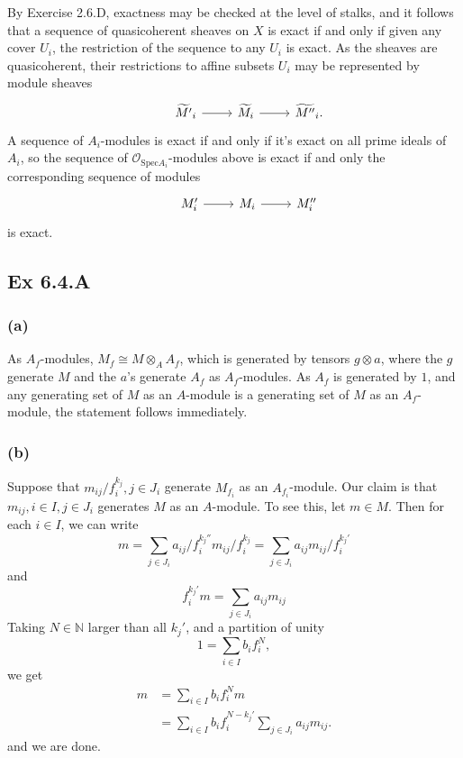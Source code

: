 \documentclass{article}
\theoremstyle{definition}
\newcommand{\N}{\mathbb{N}}
\newcommand{\Spec}{\text{Spec}}
\begin{document}
By Exercise 2.6.D, exactness may be checked at the level of stalks, and it
follows that a sequence of quasicoherent sheaves on $X$ is exact if and only if
given any cover $U_i$, the restriction of the sequence to any $U_i$ is exact.
As the sheaves are quasicoherent, their restrictions to affine subsets $U_i$
may be represented by module sheaves
\[
	\begin{tikzcd}
		& \widetilde{M'}_i
		\ar[r]
		& \widetilde{M}_i
		\ar[r]
		& \widetilde{M''}_i.
	\end{tikzcd}
\]
A sequence of $A_i$-modules is exact if and only if it's exact on all prime
ideals of $A_i$, so the sequence of $\mathcal{O}_{\Spec A_i}$-modules above is
exact if and only the corresponding sequence of modules
\[
	\begin{tikzcd}
		& M'_i
		\ar[r]
		& M_i
		\ar[r]
		& M''_i
	\end{tikzcd}
\]
is exact.

\subsection*{Ex 6.4.A}

\subsubsection*{(a)}

As $A_f$-modules, $M_f \cong M \otimes_A A_f$, which is generated by tensors $g
	\otimes a$, where the $g$ generate $M$ and the $a$'s generate $A_f$ as
$A_f$-modules. As $A_f$ is generated by $1$, and any generating set of $M$ as
an $A$-module is a generating set of $M$ as an $A_f$-module, the statement
follows immediately.

\subsubsection*{(b)}

Suppose that $m_{ij}/f_i^{k_j}, j \in J_i$ generate $M_{f_i}$ as an $A_{f_i}$-module.
Our claim is that $m_{ij}, i \in I, j \in J_i$ generates $M$ as an $A$-module. To see
this, let $m \in M$. Then for each $i \in I$, we can write
\[
	m
	=
	\sum_{j \in J_i} a_{ij}/{f_i^{k_j''}} m_{ij}/f_i^{k_j}
	=
	\sum_{j \in J_i} a_{ij} m_{ij}/f_i^{k_j'}
\]
and
\[
	f_i^{k_j'} m
	=
	\sum_{j \in J_i} a_{ij} m_{ij}
\]
Taking $N \in \N$ larger than all $k_j'$, and a partition of unity
\[
	1
	=
	\sum_{i \in I} b_i f_i^{N},
\]
we get
\begin{align*}
	m
	 & =
	\sum_{i \in I} b_i f_i^{N}m \\
	 & =
	\sum_{i \in I} b_i f_i^{N - k_j'}
	\sum_{j \in J_i} a_{ij} m_{ij}.
\end{align*}
and we are done.
\end{document}
